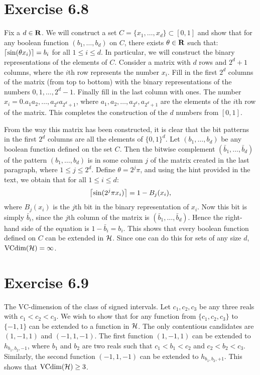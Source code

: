 \section*{Exercise 6.8}

Fix a $d \in \mathbf{R}$. We will construct a set $C = \{x_1,
\ldots, x_d\} \subset [0, 1]$ and show that for any boolean function $(b_1, \ldots, b_d)$
on $C$, there exists $\theta \in \mathbf{R}$ such that: $\left \lceil \sin (\theta x_i)  \right \rceil = b_i$
for all $1 \leq i \leq d$. In particular, we will construct the binary representations
of the elements of $C$. Consider a matrix with $d$ rows and $2^d + 1$ columns, where
the $i$th row represents the number $x_i$. Fill in the first $2^d$ columns of the matrix
(from top to bottom) with the binary representations of the numbers $0, 1, \ldots, 2^d - 1$.
Finally fill in the last column with ones. The number $x_i = 0.a_1a_2, \ldots,
a_{2^d}a_{2^d + 1}$, where $a_1, a_2, \ldots, a_{2^d}, a_{2^d + 1}$ are the elements
of the $i$th row of the matrix. This completes the construction of the $d$ numbers from
$[0, 1]$.

From the way this matrix has been constructed, it is clear that the bit patterns in the
first $2^d$ columns are all the elements of $\{0, 1\}^d$. Let $(b_1, \ldots, b_d)$ be any
boolean function defined on the set $C$. Then the bitwise complement $(\bar{b}_1, \ldots,
\bar{b}_d)$ of the pattern $(b_1, \ldots, b_d)$ is in some column $j$ of the matrix
created in the last paragraph, where $1 \leq j \leq 2^d$. Define $\theta = 2^j \pi$, and
using the hint provided in the text, we obtain that  for all $1 \leq i \leq d$:
\[
    \left \lceil \sin(2^j \pi x_i) \right \rceil = 1 - B_j(x_i),
\]
where $B_j(x_i)$ is the $j$th bit in the binary representation of $x_i$. Now this bit is
simply $\bar{b}_i$, since the $j$th column of the matrix is $(\bar{b}_1, \ldots,
\bar{b}_d)$. Hence the right-hand side of the equation is $1 - \bar{b}_i = b_i$.
This shows that every boolean function defined on $C$ can be extended in $\mathcal{H}$. Since
one can do this for sets of any size $d$, $\text{VCdim} (\mathcal{H}) = \infty$.


\section*{Exercise 6.9}

The VC-dimension of the class of signed intervals. Let $c_1, c_2, c_3$ be any
three reals with $c_1 < c_2 < c_3$. We wish to show that for any function from
$\{c_1, c_2, c_3\}$ to $\{-1, 1\}$ can be extended to a function in
$\mathcal{H}$.  The only contentious candidates are $(1, -1, 1)$ and $(-1, 1,
-1)$. The first function $(1, -1, 1)$ can be extended to $h_{b_1, b_2, -1}$,
where $b_1$ and $b_2$ are two reals such that $c_1 < b_1 < c_2$ and $c_2 < b_2
< c_3$. Similarly, the second function $(-1, 1, -1)$ can be extended to
$h_{b_1, b_2, +1}$. This shows that $\text{VCdim} (\mathcal{H}) \geq 3$.


